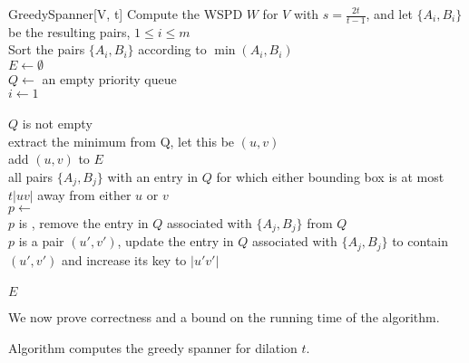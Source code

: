 \documentclass[runningheads,envcountsame,oribibl,orivec]{llncs}
\begin{document}
\begin{algorithm}{GreedySpanner}[V, t]{\label{algo:Greedy}}
  Compute the WSPD $W$ for $V$ with $s = \frac{2t}{t-1}$, and let $\{ A_i, B_i \}$ be the resulting pairs, $1 \leq i \leq m$
  \\ Sort the pairs $\{ A_i, B_i \}$ according to $\min(A_i, B_i)$
  \\ $E \gets \emptyset$
  \\ $Q \gets $ an empty priority queue
  \\ $i \gets 1$
  \\ \label{algo:fill} 
  \\ \qwhile $Q$ is not empty
  \\ \qdo extract the minimum from Q, let this be $(u, v)$
       \\ \label{algo:add} add $(u, v)$ to $E$
       \\ \qfor \label{algo:loop} all pairs $\{ A_j, B_j \}$ with an entry in $Q$ for which either bounding box is at most $t|uv|$ away from either $u$ or $v$
       \\ \qdo $p \gets $ 
            \\ \label{algo:update1} \qif $p$ is \qnil, remove the entry in $Q$ associated with $\{ A_j, B_j \}$ from $Q$ \qendif
            \\ \label{algo:update2} \qif $p$ is a pair $(u', v')$, update the entry in $Q$ associated with $\{ A_j, B_j \}$ to contain $(u', v')$ and increase its key to $|u'v'|$ \qendif
          \qendfor
       \\ 
     \qend
  \\ \qreturn $E$
\end{algorithm}

\pagebreak

We now prove correctness and a bound on the running time of the algorithm.

\begin{theorem} \label{theorem:correctness}
Algorithm  computes the greedy spanner for dilation $t$.
\end{theorem}
\end{document}
